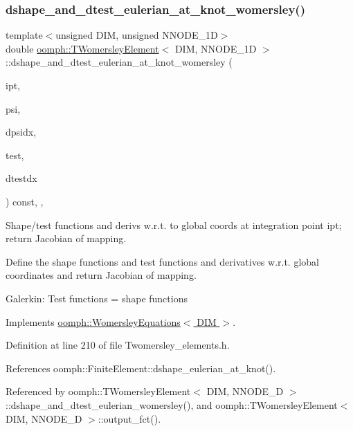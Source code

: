 \subsubsection{\texorpdfstring{dshape\+\_\+and\+\_\+dtest\+\_\+eulerian\+\_\+at\+\_\+knot\+\_\+womersley()}{dshape\_and\_dtest\_eulerian\_at\_knot\_womersley()}}
{\footnotesize\ttfamily template$<$unsigned D\+IM, unsigned N\+N\+O\+D\+E\+\_\+1D$>$ \\
double \hyperlink{classoomph_1_1TWomersleyElement}{oomph\+::\+T\+Womersley\+Element}$<$ D\+IM, N\+N\+O\+D\+E\+\_\+1D $>$\+::dshape\+\_\+and\+\_\+dtest\+\_\+eulerian\+\_\+at\+\_\+knot\+\_\+womersley (\begin{DoxyParamCaption}\item[{const unsigned \&}]{ipt,  }\item[{\hyperlink{classoomph_1_1Shape}{Shape} \&}]{psi,  }\item[{\hyperlink{classoomph_1_1DShape}{D\+Shape} \&}]{dpsidx,  }\item[{\hyperlink{classoomph_1_1Shape}{Shape} \&}]{test,  }\item[{\hyperlink{classoomph_1_1DShape}{D\+Shape} \&}]{dtestdx }\end{DoxyParamCaption}) const\hspace{0.3cm}{\ttfamily [inline]}, {\ttfamily [protected]}, {\ttfamily [virtual]}}



Shape/test functions and derivs w.\+r.\+t. to global coords at integration point ipt; return Jacobian of mapping. 

Define the shape functions and test functions and derivatives w.\+r.\+t. global coordinates and return Jacobian of mapping.

Galerkin\+: Test functions = shape functions 

Implements \hyperlink{classoomph_1_1WomersleyEquations_a5f8bd506dbebc304f30f86ef4acfbd9d}{oomph\+::\+Womersley\+Equations$<$ D\+I\+M $>$}.



Definition at line 210 of file Twomersley\+\_\+elements.\+h.



References oomph\+::\+Finite\+Element\+::dshape\+\_\+eulerian\+\_\+at\+\_\+knot().



Referenced by oomph\+::\+T\+Womersley\+Element$<$ D\+I\+M, N\+N\+O\+D\+E\+\_\+D $>$\+::dshape\+\_\+and\+\_\+dtest\+\_\+eulerian\+\_\+womersley(), and oomph\+::\+T\+Womersley\+Element$<$ D\+I\+M, N\+N\+O\+D\+E\+\_\+D $>$\+::output\+\_\+fct().

